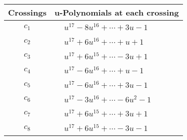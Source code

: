 \documentclass[1p]{elsarticle_modified}
\theoremstyle{definition}
\begin{document}
\begin{tabular}{m{50pt}|m{274pt}}
Crossings & \hspace{64pt}u-Polynomials at each crossing \\
\hline $$\begin{aligned}c_{1}\end{aligned}$$&$\begin{aligned}
&u^{17}-8 u^{16}+\cdots+3 u-1
\end{aligned}$\\
\hline $$\begin{aligned}c_{2}\end{aligned}$$&$\begin{aligned}
&u^{17}+6 u^{16}+\cdots+u+1
\end{aligned}$\\
\hline $$\begin{aligned}c_{3}\end{aligned}$$&$\begin{aligned}
&u^{17}+6 u^{15}+\cdots-3 u+1
\end{aligned}$\\
\hline $$\begin{aligned}c_{4}\end{aligned}$$&$\begin{aligned}
&u^{17}-6 u^{16}+\cdots+u-1
\end{aligned}$\\
\hline $$\begin{aligned}c_{5}\end{aligned}$$&$\begin{aligned}
&u^{17}-6 u^{16}+\cdots+3 u-1
\end{aligned}$\\
\hline $$\begin{aligned}c_{6}\end{aligned}$$&$\begin{aligned}
&u^{17}-3 u^{16}+\cdots-6 u^2-1
\end{aligned}$\\
\hline $$\begin{aligned}c_{7}\end{aligned}$$&$\begin{aligned}
&u^{17}+6 u^{15}+\cdots+3 u+1
\end{aligned}$\\
\hline $$\begin{aligned}c_{8}\end{aligned}$$&$\begin{aligned}
&u^{17}+6 u^{15}+\cdots-3 u-1
\end{aligned}$\\

\end{tabular}
\end{document}
